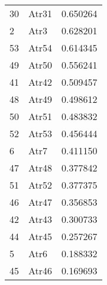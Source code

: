 \begin{tabular}{llr}
30 & Atr31 & 0.650264 \\
2 & Atr3 & 0.628201 \\
53 & Atr54 & 0.614345 \\
49 & Atr50 & 0.556241 \\
41 & Atr42 & 0.509457 \\
48 & Atr49 & 0.498612 \\
50 & Atr51 & 0.483832 \\
52 & Atr53 & 0.456444 \\
6 & Atr7 & 0.411150 \\
47 & Atr48 & 0.377842 \\
51 & Atr52 & 0.377375 \\
46 & Atr47 & 0.356853 \\
42 & Atr43 & 0.300733 \\
44 & Atr45 & 0.257267 \\
5 & Atr6 & 0.188332 \\
45 & Atr46 & 0.169693 \\
\bottomrule
\end{tabular}
